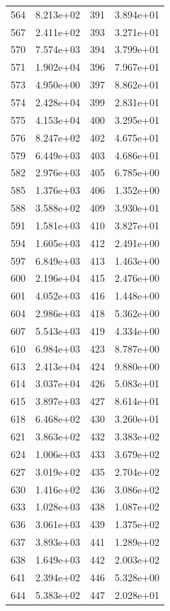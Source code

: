 \documentclass[12pt]{article}
\begin{document}
\begin{longtable}{@{}cccc@{}}
564 & 8.213e+02 & 391 & 3.894e+01 \\
567 & 2.411e+02 & 393 & 3.271e+01 \\
570 & 7.574e+03 & 394 & 3.799e+01 \\
571 & 1.902e+04 & 396 & 7.967e+01 \\
573 & 4.950e+00 & 397 & 8.862e+01 \\
574 & 2.428e+04 & 399 & 2.831e+01 \\
575 & 4.153e+04 & 400 & 3.295e+01 \\
576 & 8.247e+02 & 402 & 4.675e+01 \\
579 & 6.449e+03 & 403 & 4.686e+01 \\
582 & 2.976e+03 & 405 & 6.785e+00 \\
585 & 1.376e+03 & 406 & 1.352e+00 \\
588 & 3.588e+02 & 409 & 3.930e+01 \\
591 & 1.581e+03 & 410 & 3.827e+01 \\
594 & 1.605e+03 & 412 & 2.491e+00 \\
597 & 6.849e+03 & 413 & 1.463e+00 \\
600 & 2.196e+04 & 415 & 2.476e+00 \\
601 & 4.052e+03 & 416 & 1.448e+00 \\
604 & 2.986e+03 & 418 & 5.362e+00 \\
607 & 5.543e+03 & 419 & 4.334e+00 \\
610 & 6.984e+03 & 423 & 8.787e+00 \\
613 & 2.413e+04 & 424 & 9.880e+00 \\
614 & 3.037e+04 & 426 & 5.083e+01 \\
615 & 3.897e+03 & 427 & 8.614e+01 \\
618 & 6.468e+02 & 430 & 3.260e+01 \\
621 & 3.863e+02 & 432 & 3.383e+02 \\
624 & 1.006e+03 & 433 & 3.679e+02 \\
627 & 3.019e+02 & 435 & 2.704e+02 \\
630 & 1.416e+02 & 436 & 3.086e+02 \\
633 & 1.028e+03 & 438 & 1.087e+02 \\
636 & 3.061e+03 & 439 & 1.375e+02 \\
637 & 3.893e+03 & 441 & 1.289e+02 \\
638 & 1.649e+03 & 442 & 2.003e+02 \\
641 & 2.394e+02 & 446 & 5.328e+00 \\
644 & 5.383e+02 & 447 & 2.028e+01 \\

\end{longtable}
\end{document}
